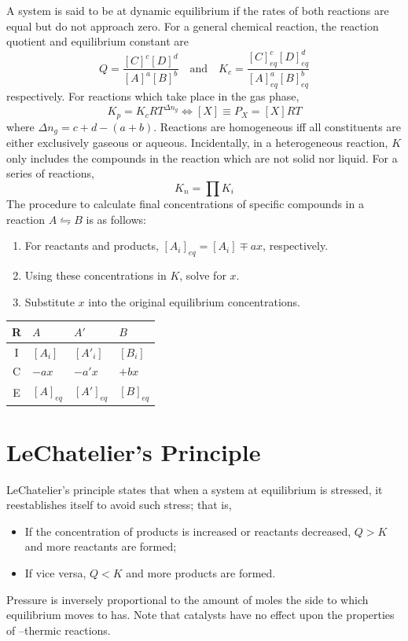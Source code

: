 \documentclass{tufte-book}
\begin{document}
A system is said to be at dynamic equilibrium if the rates of both reactions are equal but do not approach zero. For a general chemical reaction, the reaction quotient and equilibrium constant are
\begin{equation}
  Q = \frac{[C]^c [D]^d}{[A]^a [B]^b} \quad\text{and}\quad K_c = \frac{[C]^c_{eq} [D]^d_{eq}}{[A]^a_{eq} [B]^b_{eq}}
\end{equation}
respectively. For reactions which take place in the gas phase, \begin{equation}
  K_p = K_c RT^{\Delta n_g} \iff [X] \equiv P_X = [X]RT
\end{equation}
where $\Delta n_g = c+d-(a+b)$. Reactions are homogeneous iff all constituents are either exclusively gaseous or aqueous. Incidentally, in a heterogeneous reaction, $K$ only includes the compounds in the reaction which are not solid nor liquid. For a series of reactions, \begin{equation}
  K_n = \prod K_i
\end{equation}
The procedure to calculate final concentrations of specific compounds in a reaction $A \leftrightharpoons B$ is as follows:
\begin{enumerate}
  \item For reactants and products, $[A_i]_{eq} = [A_i] \mp ax$, respectively.
  \item Using these concentrations in $K$, solve for $x$.
  \item Substitute $x$ into the original equilibrium concentrations.
\end{enumerate}
\begin{center}
  \begin{tabular}{clll}
    R & $A$ & $A'$ & $B$ \\
    \hline
    I & $[A_i]$ & $[A'_i]$ & $[B_i]$ \\
    C & $-ax$ & $-a'x$ &  $+bx$ \\
    E & $[A]_{eq}$ & $[A']_{eq}$ & $[B]_{eq}$
  \end{tabular}
\end{center}

\section{LeChatelier's Principle}

LeChatelier's principle states that when a system at equilibrium is stressed, it reestablishes itself to avoid such stress; that is,
\begin{itemize}
  \item If the concentration of products is increased or reactants decreased, $Q>K$ and more reactants are formed;
  \item If vice versa, $Q<K$ and more products are formed.
\end{itemize}
Pressure is inversely proportional to the amount of moles the side to which equilibrium moves to has. Note that catalysts have no effect upon the properties of --thermic reactions.
\end{document}

